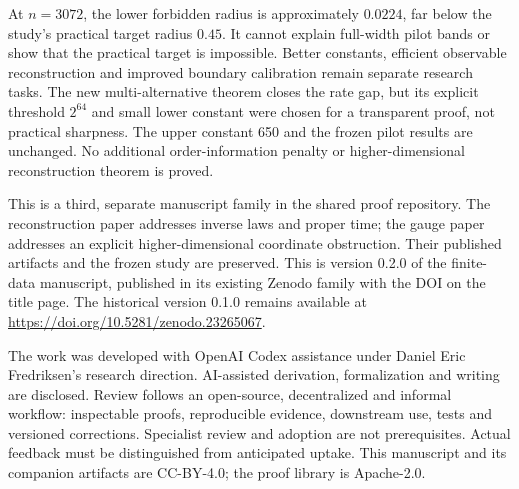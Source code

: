 \documentclass[11pt]{article}
\theoremstyle{remark}
\begin{document}
At $n=3072$, the lower forbidden radius is approximately $0.0224$,
far below the study's practical target radius $0.45$.
It cannot explain full-width pilot bands or show that the practical
target is impossible. Better constants, efficient observable
reconstruction and improved boundary calibration remain separate
research tasks. The new multi-alternative theorem closes the rate gap,
but its explicit threshold $2^{64}$ and small lower constant were chosen
for a transparent proof, not practical sharpness. The upper constant
650 and the frozen pilot results are unchanged.
No additional order-information penalty or higher-dimensional
reconstruction theorem is proved.

This is a third, separate manuscript family in the shared proof
repository. The reconstruction paper \cite{Reconstruction} addresses
inverse laws and proper time; the gauge paper \cite{Gauge} addresses
an explicit higher-dimensional coordinate obstruction. Their published
artifacts and the frozen study are preserved. This is version 0.2.0
of the finite-data manuscript, published in its existing Zenodo
family with the DOI on the title page. The historical version
0.1.0 remains available at
\url{https://doi.org/10.5281/zenodo.23265067}.

The work was developed with OpenAI Codex assistance under Daniel Eric
Fredriksen's research direction. AI-assisted derivation, formalization
and writing are disclosed. Review follows an open-source,
decentralized and informal workflow: inspectable proofs, reproducible
evidence, downstream use, tests and versioned corrections. Specialist
review and adoption are not prerequisites. Actual feedback must be
distinguished from anticipated uptake. This manuscript and its
companion artifacts are CC-BY-4.0; the proof library is Apache-2.0.
\end{document}
